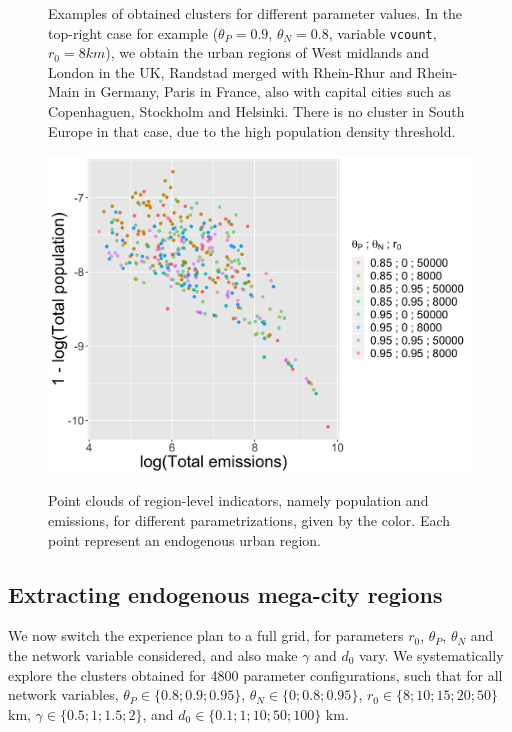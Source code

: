 \documentclass{article}
\begin{document}
\begin{figure}[h!]
  \caption{Examples of obtained clusters for different parameter values. In the top-right case for example ($\theta_P = 0.9$, $\theta_N = 0.8$, variable \texttt{vcount},$r_0 = 8km$), we obtain the urban regions of West midlands and London in the UK, Randstad merged with Rhein-Rhur and Rhein-Main in Germany, Paris in France, also with capital cities such as Copenhaguen, Stockholm and Helsinki. There is no cluster in South Europe in that case, due to the high population density threshold.\label{fig:exclusters}}
\end{figure}


\begin{figure}[h!] 
  {\includegraphics[width=0.7\linewidth]{full_effective_pareto.png}}
  \centering
  \caption{Point clouds of region-level indicators, namely population and emissions, for different parametrizations, given by the color. Each point represent an endogenous urban region.\label{fig:paretos}}
\end{figure}

\subsection{Extracting endogenous mega-city regions}


We now switch the experience plan to a full grid, for parameters $r_0$, $\theta_P$, $\theta_N$ and the network variable considered, and also make $\gamma$ and $d_0$ vary. We systematically explore the clusters obtained for 4800 parameter configurations, such that for all network variables, $\theta_P \in \{ 0.8 ; 0.9 ; 0.95 \}$, $\theta_N \in \{0 ; 0.8 ; 0.95 \}$, $r_0 \in \{ 8 ; 10 ; 15 ; 20 ; 50\}$ km, $\gamma \in \{ 0.5 ; 1 ; 1.5 ; 2\}$, and $d_0 \in \{ 0.1 ; 1 ; 10 ; 50 ; 100\}$ km.
\end{document}
